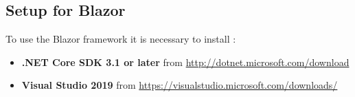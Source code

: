 \documentclass{scrartcl}
\begin{document}
\subsection{Setup for Blazor}
To use the Blazor framework it is necessary to install :\\
\begin{itemize}
\item \textbf{.NET Core SDK 3.1 or later} from \url {http://dotnet.microsoft.com/download}
\item \textbf{Visual Studio 2019} from \url {https://visualstudio.microsoft.com/downloads/}
\end{itemize}








  		
\end{document}

